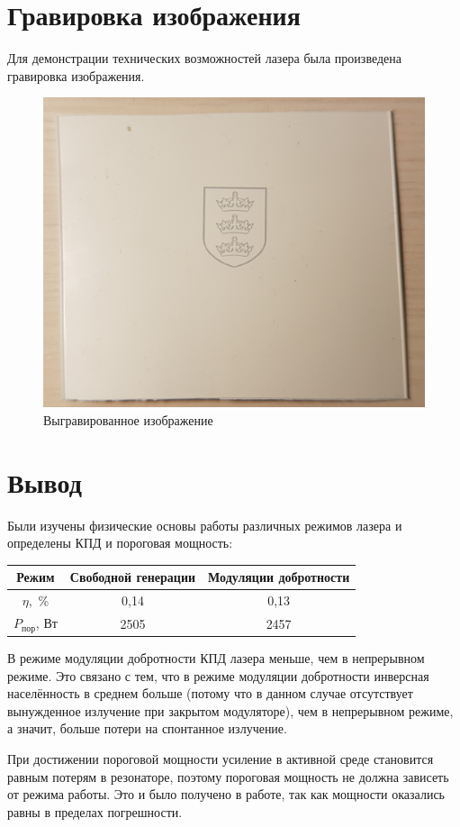 \documentclass[a4paper, 12pt]{article}
\begin{document}
\section{Гравировка изображения}
Для демонстрации технических возможностей лазера была произведена гравировка изображения.
\begin{figure}[!htb]
	\centering
	\includegraphics[scale=0.12]{card.jpg}
	\caption{Выгравированное изображение}
\end{figure}
\section{Вывод}
Были изучены физические основы работы различных режимов лазера и определены КПД и пороговая мощность:
\begin{table}[h!]
		\centering
		\begin{tabular}{|c||c|c|}
			\hline
			Режим & Свободной генерации   & Модуляции добротности \\ 					\hline
			$\eta$,~\%   & 0,14 & 0,13 \\ \hline
			$P_{\text{пор}}$, Вт    & 2505 & 2457 \\
			\hline
		\end{tabular}
	\end{table}\par
	В режиме модуляции добротности КПД лазера меньше, чем в непрерывном режиме. Это связано с тем, что в режиме модуляции добротности инверсная населённость в среднем больше (потому что в данном случае отсутствует вынужденное излучение при закрытом модуляторе), чем в непрерывном режиме, а значит, больше потери на спонтанное излучение.\par
	При достижении пороговой мощности усиление в активной среде становится равным потерям в резонаторе, поэтому пороговая мощность не должна зависеть от режима работы. Это и было получено в работе, так как мощности оказались равны в пределах погрешности.
\end{document}
